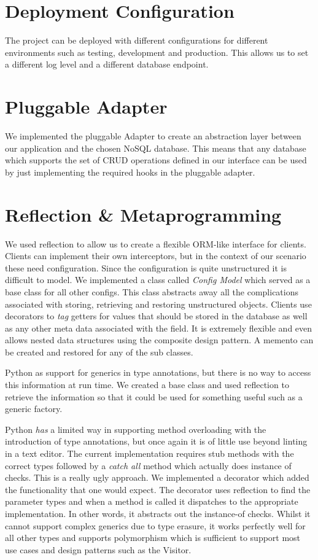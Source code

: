   \section{Deployment Configuration}
  The project can be deployed with different configurations for different environments such as
  testing, development and production. This allows us to set a different log level and a different
  database endpoint.

  \section{Pluggable Adapter}
  We implemented the pluggable Adapter to create an abstraction layer between our application and
  the chosen NoSQL database. This means that any database which supports the set of CRUD operations
  defined in our interface can be used by just implementing the required hooks in the pluggable
  adapter.

  \section{Reflection \& Metaprogramming}
  \label{added_value_reflection}
  We used reflection to allow us to create a flexible ORM-like interface for clients.
  Clients can implement their own interceptors, but in the context of our scenario these need
  configuration. Since the configuration is quite unstructured it is difficult to model.
  We implemented a class called \emph{Config Model} which served as a base class for all other configs.
  This class abstracts away all the complications associated with storing, retrieving and restoring
  unstructured objects. Clients use decorators to \emph{tag} getters for values that should be stored
  in the database as well as any other meta data associated with the field.
  It is extremely flexible and even allows nested data structures using the composite design
  pattern. A memento can be created and restored for any of the sub classes.

  Python as support for generics in type annotations, but there is no way to access this information
  at run time. We created a base class and used reflection to retrieve the information so that it
  could be used for something useful such as a generic factory.

  Python \emph{has} a limited way in supporting method overloading with the introduction of type
  annotations, but once again it is of little use beyond linting in a text editor.
  The current implementation requires stub methods with the correct types followed by a \emph{catch
  all} method which actually does instance of checks. This is a really ugly approach.
  We implemented a decorator which added the functionality that one would expect. The decorator
  uses reflection to find the parameter types and when a method is called it dispatches to the
  appropriate implementation. In other words, it abstracts out the instance-of checks.
  Whilst it cannot support complex generics due to type erasure, it works perfectly well
  for all other types and supports polymorphism which is sufficient to support most use cases
  and design patterns such as the Visitor.


